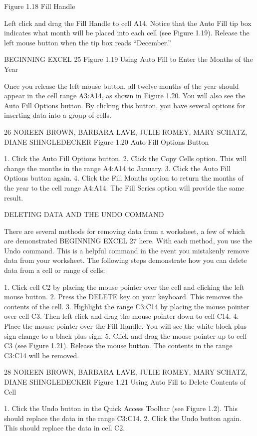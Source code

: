 Figure 1.18 Fill Handle


Left click and drag the Fill Handle to cell A14. Notice that the Auto Fill tip box indicates what month
will be placed into each cell (see Figure 1.19). Release the left mouse button when the tip box reads
“December.”

BEGINNING EXCEL 25
Figure 1.19 Using Auto Fill to Enter the Months of the Year


Once you release the left mouse button, all twelve months of the year should appear in the cell range
A3:A14, as shown in Figure 1.20. You will also see the Auto Fill Options button. By clicking this
button, you have several options for inserting data into a group of cells.

26 NOREEN BROWN, BARBARA LAVE, JULIE ROMEY, MARY SCHATZ, DIANE SHINGLEDECKER
Figure 1.20 Auto Fill Options Button


1.   Click the Auto Fill Options button.
2.   Click the Copy Cells option. This will change the months in the range A4:A14 to January.
3.   Click the Auto Fill Options button again.
4.   Click the Fill Months option to return the months of the year to the cell range A4:A14. The Fill
Series option will provide the same result.

DELETING DATA AND THE UNDO COMMAND

There are several methods for removing data from a worksheet, a few of which are demonstrated
BEGINNING EXCEL 27
here. With each method, you use the Undo command. This is a helpful command in the event you
mistakenly remove data from your worksheet. The following steps demonstrate how you can delete
data from a cell or range of cells:

1. Click cell C2 by placing the mouse pointer over the cell and clicking the left mouse button.
2. Press the DELETE key on your keyboard. This removes the contents of the cell.
3. Highlight the range C3:C14 by placing the mouse pointer over cell C3. Then left click and drag
the mouse pointer down to cell C14.
4. Place the mouse pointer over the Fill Handle. You will see the white block plus sign change to a
black plus sign.
5. Click and drag the mouse pointer up to cell C3 (see Figure 1.21). Release the mouse button. The
contents in the range C3:C14 will be removed.




28 NOREEN BROWN, BARBARA LAVE, JULIE ROMEY, MARY SCHATZ, DIANE SHINGLEDECKER
Figure 1.21 Using Auto Fill to Delete Contents of Cell


1. Click the Undo button in the Quick Access Toolbar (see Figure 1.2). This should replace the data
in the range C3:C14.
2. Click the Undo button again. This should replace the data in cell C2.


